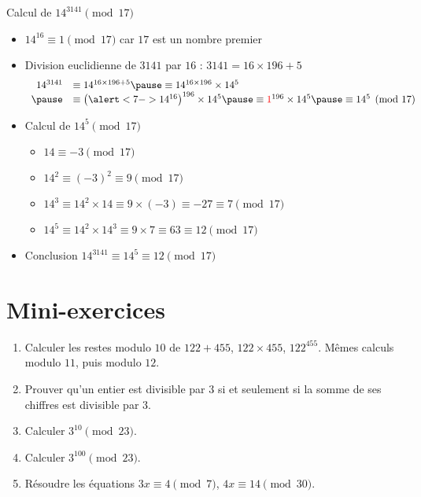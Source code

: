 \begin{frame}
\begin{exemple}

Calcul de $14^{3141} \pmod {17}$

\pause

\begin{itemize}
  \item $14^{16} \equiv 1 \pmod {17}$ car $17$ est un nombre premier
\pause
  \item Division euclidienne de $3141$ par $16$ : $3141 = 16\times 196 + 5$
\pause
$$
\begin{array}{rl}
14^{3141} &\equiv 14^{16 \times 196 + 5} 
\pause
          \equiv 14^{16\times 196}\times 14^5 \\
\pause
          &\equiv \left(\alert<7->{14^{16}}\right)^{196}\times 14^5 
\pause
\equiv \textcolor{red}{1}^{196} \times 14^5 
\pause
\equiv  14^5\pmod{17}
\end{array}$$
\pause
  \item Calcul de $14^5 \pmod{17}$
  \begin{itemize}
\pause
     \item $14 \equiv -3 \pmod {17}$ 
\pause
     \item $14^2\equiv (-3)^2 \equiv 9 \pmod {17}$
\pause
     \item $14^3 \equiv 14^2 \times 14 \equiv 9 \times (-3) \equiv -27 \equiv 7 \pmod{17}$
\pause
     \item $14^5 \equiv 14^2 \times 14^3 \equiv 9 \times 7 \equiv 63 \equiv 12 \pmod {17}$
  \end{itemize}
\pause
  \item Conclusion $14^{3141}  \equiv 14^5 \equiv 12 \pmod {17}$
\end{itemize}

\end{exemple}
\end{frame}



\section*{Mini-exercices}

\begin{frame}
\begin{miniexercice}
\begin{enumerate}
  \item Calculer les restes modulo $10$ de $122+455$, $122\times 455$, $122^{455}$.
Mêmes calculs modulo $11$, puis modulo $12$.
  \item Prouver qu'un entier est divisible par $3$ si et seulement 
si la somme de ses chiffres est divisible par $3$.
  \item Calculer $3^{10} \pmod {23}$. 
  \item Calculer $3^{100} \pmod {23}$.
  \item Résoudre les équations $3x\equiv 4 \pmod{7}$, $4x \equiv 14 \pmod {30}$.
\end{enumerate} 
\end{miniexercice}
\end{frame}


